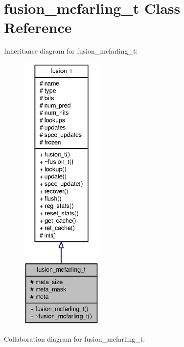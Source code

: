 \section{fusion\_\-mcfarling\_\-t Class Reference}
\label{classfusion__mcfarling__t}
Inheritance diagram for fusion\_\-mcfarling\_\-t:\nopagebreak
\begin{figure}[H]
\begin{center}
\leavevmode
\includegraphics[height=400pt]{classfusion__mcfarling__t__inherit__graph}
\end{center}
\end{figure}
Collaboration diagram for fusion\_\-mcfarling\_\-t:\nopagebreak
